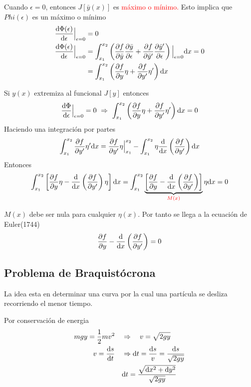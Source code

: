 \documentclass[../main]{subfiles}
\begin{document}
Cuando $\epsilon=0$, entonces $J[\bar{y}(x)]$ es \textcolor{red}{máximo o mínimo.} Esto implica que $Phi(\epsilon)$ es un máximo o mínimo
\begin{equation}
    \begin{split}
        \dv{\Phi(\epsilon)}{\epsilon}\Big{|}_{\epsilon=0}&=0\\
        \dv{\Phi(\epsilon)}{\epsilon}\Big{|}_{\epsilon=0}&=\int_{x_1}^{x_2}\left(\pdv{f}{\bar{y}}\pdv{\bar{y}}{\epsilon}+\pdv{f}{\bar{y}'}\pdv{\bar{y}'}{\epsilon}\right)\Big{|}_{\epsilon=0}\mathrm{d}x=0\\
        &=\int_{x_1}^{x_2}\left(\pdv{f}{y}\eta+\pdv{f}{y'}\eta'\right)\mathrm{d}x
    \end{split}
\end{equation}

Si $y(x)$ extremiza al funcional $J[y]$ entonces
\begin{equation}
    \dv{\Phi}{\epsilon}\Big{|}_{\epsilon=0}=0 \ \Rightarrow \ \int_{x_1}^{x_2}\left(\pdv{f}{y}\eta+\pdv{f}{y'}\eta'\right)\mathrm{d}x=0
\end{equation}
Haciendo una integración por partes
\begin{equation}
    \int_{x_1}^{x_2}\pdv{f}{y'}\eta' \mathrm{d}x=\pdv{f}{y'}\eta\Big{|}_{x_1}^{x_2}-\int_{x_1}^{x_2}\eta \dv{}{x}\left(\pdv{f}{y'}\right)\mathrm{d}x
\end{equation}
Entonces
\begin{equation}
    \int_{x_1}^{x_2}\left[\pdv{f}{y}\eta-\dv{}{x}\left(\pdv{f}{y'}\right)\eta\right]\mathrm{d}x=\int_{x_1}^{x_2}\underbrace{\left[\pdv{f}{y}-\dv{}{x}\left(\pdv{f}{y'}\right)\right]}_{\textcolor{red}{M(x)}} \eta \mathrm{d}x=0
\end{equation}

$M(x)$ debe ser nula para cualquier $\eta(x)$. Por tanto se llega a la ecuación de Euler(1744)
\begin{equation}
    \pdv{f}{y}-\dv{}{x}\left(\pdv{f}{y'}\right)=0
\end{equation}

\subsection{Problema de Braquistócrona}
La idea esta en determinar una curva por la cual una partícula se desliza recorriendo el menor tiempo.

Por conservación de energia
\begin{equation}
    \begin{split}
        mgy=\dfrac{1}{2}mv^2 \quad &\Rightarrow \quad v=\sqrt{2gy}\\
        v=\dv{s}{t} \quad &\Rightarrow \mathrm{d}t=\dfrac{\mathrm{d}s}{v}=\dfrac{\mathrm{d}s}{\sqrt{2gy}}\\
        &\mathrm{d}t=\dfrac{\sqrt{\mathrm{d}x^2+\mathrm{d}y^2}}{\sqrt{2gy}}
    \end{split}
\end{equation}
\end{document}
